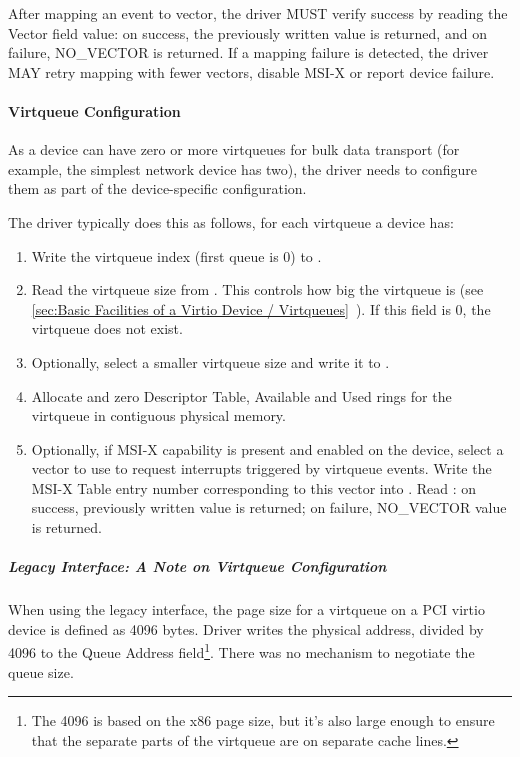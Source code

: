 After mapping an event to vector, the
driver MUST verify success by reading the Vector field value: on
success, the previously written value is returned, and on
failure, NO_VECTOR is returned. If a mapping failure is detected,
the driver MAY retry mapping with fewer vectors, disable MSI-X
or report device failure.

\paragraph{Virtqueue Configuration}\label{sec:Virtio Transport Options / Virtio Over PCI Bus / PCI-specific Initialization And Device Operation / Device Initialization / Virtqueue Configuration}

As a device can have zero or more virtqueues for bulk data
transport (for example, the simplest network device has two), the driver
needs to configure them as part of the device-specific
configuration.

The driver typically does this as follows, for each virtqueue a device has:

\begin{enumerate}
\item Write the virtqueue index (first queue is 0) to .

\item Read the virtqueue size from . This controls how big the virtqueue is
  (see \ref{sec:Basic Facilities of a Virtio Device / Virtqueues}~). If this field is 0, the virtqueue does not exist.

\item Optionally, select a smaller virtqueue size and write it to .

\item Allocate and zero Descriptor Table, Available and Used rings for the
   virtqueue in contiguous physical memory.

\item Optionally, if MSI-X capability is present and enabled on the
  device, select a vector to use to request interrupts triggered
  by virtqueue events. Write the MSI-X Table entry number
  corresponding to this vector into . Read
  : on success, previously written value is
  returned; on failure, NO_VECTOR value is returned.
\end{enumerate}

\subparagraph{Legacy Interface: A Note on Virtqueue Configuration}\label{sec:Virtio Transport Options / Virtio Over PCI Bus / PCI-specific Initialization And Device Operation / Device Initialization / Virtqueue Configuration / Legacy Interface: A Note on Virtqueue Configuration}
When using the legacy interface, the page size for a virtqueue on a PCI virtio
device is defined as 4096 bytes.  Driver writes the physical address, divided
by 4096 to the Queue Address field\footnote{The 4096 is based on the x86 page size, but it's also large
enough to ensure that the separate parts of the virtqueue are on
separate cache lines.
}.  There was no mechanism to negotiate the queue size.

